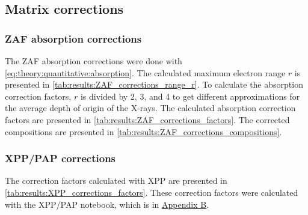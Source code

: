 \subsection{Matrix corrections}
\label{results:matrix_corrections}



\subsubsection{ZAF absorption corrections}
\label{results:matrix_corrections:ZAF}

The ZAF absorption corrections were done with \cref{eq:theory:quantitative:absorption}. %
The calculated maximum electron range $r$ is presented in \cref{tab:results:ZAF_corrections_range_r}.
To calculate the absorption correction factors, $r$ is divided by 2, 3, and 4 to get different approximations for the average depth of origin of the X-rays.
The calculated absorption correction factors are presented in \cref{tab:results:ZAF_corrections_factors}.
The corrected compositions are presented in \cref{tab:results:ZAF_corrections_compositions}.













\subsubsection{XPP/PAP corrections}
\label{results:matrix_corrections:XPP}

The correction factors calculated with XPP are presented in \cref{tab:results:XPP_corrections_factors}.
These correction factors were calculated with the XPP/PAP notebook, which is in \hyperref[appendix:xpp]{Appendix B}.




% 
% 
